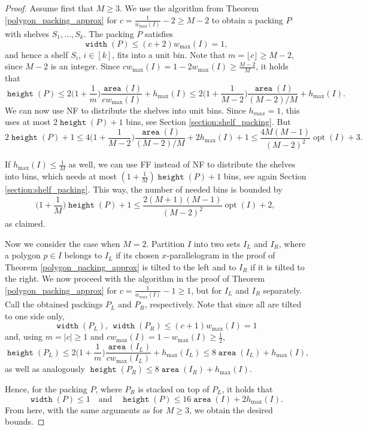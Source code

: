 \documentclass[a4paper,UKenglish,cleveref, autoref, thm-restate]{lipics_v2021}
\DeclareMathOperator{\opt}{opt}
\DeclareMathOperator{\area}{\mathtt{area}}
\DeclareMathOperator{\width}{\mathtt{width}}
\DeclareMathOperator{\height}{\mathtt{height}}
\begin{document}
\begin{proof}
Assume first that $M \geq 3$. We use the algorithm from Theorem \ref{polygon_packing_approx} for $c=\frac{1}{w_{\max}(I)}-2 \geq M-2$ to obtain a packing $P$ with shelves $S_1, \dots, S_k$. The packing $P$ satisfies
\[
\width(P) \leq (c+2)w_{\max}(I) = 1,
\]
and hence a shelf $S_i$, $i \in [k]$, fits into a unit bin. Note that $m = \lfloor c \rfloor \geq M-2$, since $M-2$ is an integer. Since $cw_{\max}(I) = 1-2w_{\max}(I) \geq \frac{M-2}{M}$, it holds that
\[
\height(P) \leq 2\bigg(1+\frac{1}{m}\bigg)\frac{\area(I)}{cw_{\max}(I)} + h_{\max}(I) \leq 2\bigg(1+\frac{1}{M-2}\bigg)\frac{\area(I)}{(M-2)/M} + h_{\max}(I).
\]
We can now use NF to distribute the shelves into unit bins. Since $h_{max} = 1$, this uses at most $2\height(P)+1$ bins, see Section \ref{section:shelf_packing}. But
\[
2 \height(P) + 1 \leq 4\bigg(1+\frac{1}{M-2}\bigg) \frac{\area(I)}{(M-2)/M} + 2h_{\max}(I) + 1 \leq \frac{4M(M-1)}{(M-2)^2}\opt(I) + 3.
\]

If $h_{\max}(I) \leq \frac{1}{M}$ as well, we can use FF instead of NF to distribute the shelves into bins, which needs at most $(1+\frac{1}{M})\height(P)+1$ bins, see again Section \ref{section:shelf_packing}. This way, the number of needed bins is bounded by
\[
\bigg(1+\frac{1}{M}\bigg) \height(P) + 1 \leq \frac{2(M+1)(M-1)}{(M-2)^2}\opt(I)+2,
\]
as claimed.

Now we consider the case when $M=2$. Partition $I$ into two sets $I_L$ and $I_R$, where a polygon $p \in I$ belongs to $I_L$ if its chosen $x$-parallelogram in the proof of Theorem \ref{polygon_packing_approx} is tilted to the left and to $I_R$ if it is tilted to the right. We now proceed with the algorithm in the proof of Theorem \ref{polygon_packing_approx} for $c=\frac{1}{w_{max}(I)} - 1 \geq 1$, but for $I_L$ and $I_R$ separately. Call the obtained packings $P_L$ and $P_R$, respectively. Note that since all are tilted to one side only,
\[
\width(P_L), \, \width(P_R) \leq (c+1)w_{\max}(I) = 1
\]
and, using $m=\lvert c \rvert \geq 1$ and $cw_{\max}(I) = 1-w_{\max}(I) \geq \frac{1}{2}$,
\[
\height(P_L) \leq 2\bigg(1+\frac{1}{m}\bigg)\frac{\area(I_L)}{cw_{\max}(I_L)} + h_{\max}(I_L) \leq 8\area(I_L) + h_{\max}(I),
\]
as well as analogously $\height(P_R) \leq 8 \area(I_R) + h_{\max}(I)$.

Hence, for the packing $P$, where $P_R$ is stacked on top of $P_L$, it holds that
\[
\width(P) \leq 1 \quad \text{and} \quad \height(P) \leq 16 \area(I) + 2 h_{\max}(I).
\]
From here, with the same arguments as for $M \geq 3$, we obtain the desired bounds.
\end{proof}
\end{document}
